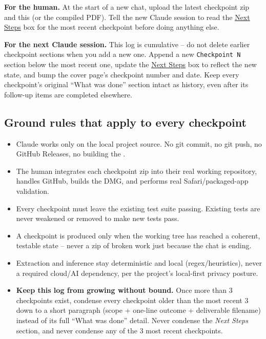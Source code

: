 \documentclass[11pt]{article}
\newcommand{\file}[1]{\texttt{\detokenize{#1}}}
\begin{document}
\begin{infobox}
\textbf{For the human.} At the start of a new chat, upload the latest checkpoint zip and this \file{.tex} (or the compiled PDF). Tell the new Claude session to read the \hyperref[sec:next-steps]{Next Steps} box for the most recent checkpoint before doing anything else.
\end{infobox}

\begin{infobox}
\textbf{For the next Claude session.} This log is cumulative -- do not delete earlier checkpoint sections when you add a new one. Append a new \texttt{Checkpoint N} section below the most recent one, update the \hyperref[sec:next-steps]{Next Steps} box to reflect the new state, and bump the cover page's checkpoint number and date. Keep every checkpoint's original ``What was done'' section intact as history, even after its follow-up items are completed elsewhere.
\end{infobox}

\subsection{Ground rules that apply to every checkpoint}
\begin{itemize}
  \item Claude works only on the local project source. No git commit, no git push, no GitHub Releases, no building the \file{.dmg}.
  \item The human integrates each checkpoint zip into their real working repository, handles GitHub, builds the DMG, and performs real Safari/packaged-app validation.
  \item Every checkpoint must leave the existing test suite passing. Existing tests are never weakened or removed to make new tests pass.
  \item A checkpoint is produced only when the working tree has reached a coherent, testable state -- never a zip of broken work just because the chat is ending.
  \item Extraction and inference stay deterministic and local (regex/heuristics), never a required cloud/AI dependency, per the project's local-first privacy posture.
  \item \textbf{Keep this log from growing without bound.} Once more than 3 checkpoints exist, condense every checkpoint older than the most recent 3 down to a short paragraph (scope + one-line outcome + deliverable filename) instead of its full ``What was done'' detail. Never condense the \emph{Next Steps} section, and never condense any of the 3 most recent checkpoints.
\end{itemize}
\end{document}
